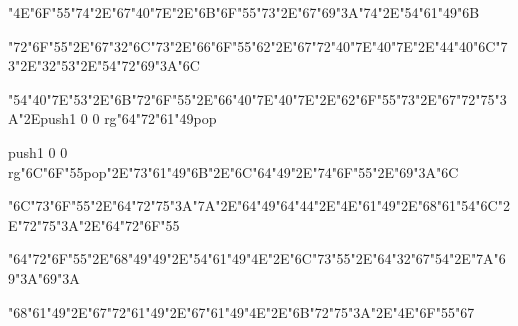 \vfill\eject
\null\vfill
\centerline{\ipa\char"4E\ipa\char"6F\ipa\char"55\ipa\char"74\ipa\char"2E\ipa\char"67\ipa\char"40\ipa\char"7E\ipa\char"2E\ipa\char"6B\ipa\char"6F\ipa\char"55\ipa\char"73\ipa\char"2E\ipa\char"67\ipa\char"69\ipa\char"3A\ipa\char"74\ipa\char"2E\ipa\char"54\ipa\char"61\ipa\char"49\ipa\char"6B}\bigskip
\centerline{\ipa\char"72\ipa\char"6F\ipa\char"55\ipa\char"2E\ipa\char"67\ipa\char"32\ipa\char"6C\ipa\char"73\ipa\char"2E\ipa\char"66\ipa\char"6F\ipa\char"55\ipa\char"62\ipa\char"2E\ipa\char"67\ipa\char"72\ipa\char"40\ipa\char"7E\ipa\char"40\ipa\char"7E\ipa\char"2E\ipa\char"44\ipa\char"40\ipa\char"6C\ipa\char"73\ipa\char"2E\ipa\char"32\ipa\char"53\ipa\char"2E\ipa\char"54\ipa\char"72\ipa\char"69\ipa\char"3A\ipa\char"6C}\bigskip
\centerline{\ipa\char"54\ipa\char"40\ipa\char"7E\ipa\char"53\ipa\char"2E\ipa\char"6B\ipa\char"72\ipa\char"6F\ipa\char"55\ipa\char"2E\ipa\char"66\ipa\char"40\ipa\char"7E\ipa\char"40\ipa\char"7E\ipa\char"2E\ipa\char"62\ipa\char"6F\ipa\char"55\ipa\char"73\ipa\char"2E\ipa\char"67\ipa\char"72\ipa\char"75\ipa\char"3A\ipa\char"2E\pdfcolorstack\match push{1 0 0 rg}\ipa\char"64\ipa\char"72\ipa\char"61\ipa\char"49\pdfcolorstack\match pop{}}
\vfill\eject
\null\vfill
\centerline{\pdfcolorstack\match push{1 0 0 rg}\ipa\char"6C\ipa\char"6F\ipa\char"55\pdfcolorstack\match pop{}\ipa\char"2E\ipa\char"73\ipa\char"61\ipa\char"49\ipa\char"6B\ipa\char"2E\ipa\char"6C\ipa\char"64\ipa\char"49\ipa\char"2E\ipa\char"74\ipa\char"6F\ipa\char"55\ipa\char"2E\ipa\char"69\ipa\char"3A\ipa\char"6C}\bigskip
\centerline{\ipa\char"6C\ipa\char"73\ipa\char"6F\ipa\char"55\ipa\char"2E\ipa\char"64\ipa\char"72\ipa\char"75\ipa\char"3A\ipa\char"7A\ipa\char"2E\ipa\char"64\ipa\char"49\ipa\char"64\ipa\char"44\ipa\char"2E\ipa\char"4E\ipa\char"61\ipa\char"49\ipa\char"2E\ipa\char"68\ipa\char"61\ipa\char"54\ipa\char"6C\ipa\char"2E\ipa\char"72\ipa\char"75\ipa\char"3A\ipa\char"2E\ipa\char"64\ipa\char"72\ipa\char"6F\ipa\char"55}\bigskip
\centerline{\ipa\char"64\ipa\char"72\ipa\char"6F\ipa\char"55\ipa\char"2E\ipa\char"68\ipa\char"49\ipa\char"49\ipa\char"2E\ipa\char"54\ipa\char"61\ipa\char"49\ipa\char"4E\ipa\char"2E\ipa\char"6C\ipa\char"73\ipa\char"55\ipa\char"2E\ipa\char"64\ipa\char"32\ipa\char"67\ipa\char"54\ipa\char"2E\ipa\char"7A\ipa\char"69\ipa\char"3A\ipa\char"69\ipa\char"3A}
\vfill\eject
\null\vfill
\centerline{\ipa\char"68\ipa\char"61\ipa\char"49\ipa\char"2E\ipa\char"67\ipa\char"72\ipa\char"61\ipa\char"49\ipa\char"2E\ipa\char"67\ipa\char"61\ipa\char"49\ipa\char"4E\ipa\char"2E\ipa\char"6B\ipa\char"72\ipa\char"75\ipa\char"3A\ipa\char"2E\ipa\char"4E\ipa\char"6F\ipa\char"55\ipa\char"67}\bigskip
